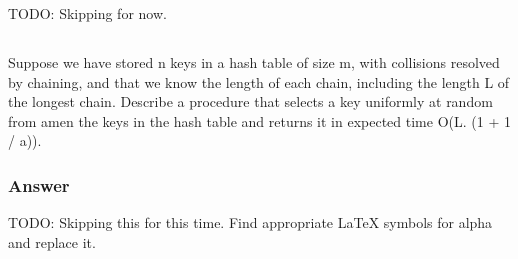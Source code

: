    TODO: Skipping for now.

   \subsection{}

   Suppose we have stored n keys in a hash table of size m, with collisions
   resolved by chaining, and that we know the length of each chain, including
   the length L of the longest chain. Describe a procedure that selects a key
   uniformly at random from amen the keys in the hash table and returns it in
   expected time O(L. (1 + 1 / a)).

   \subsubsection{Answer}

   TODO: Skipping this for this time. Find appropriate LaTeX symbols for alpha
   and replace it.
